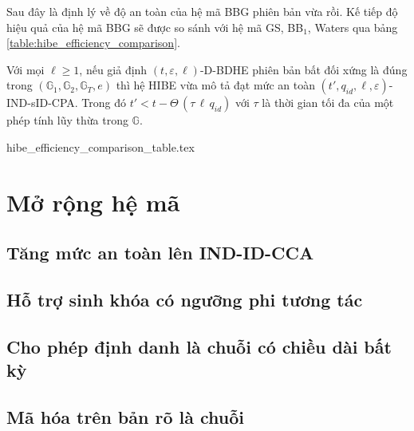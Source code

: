 \documentclass[class=report, crop=false]{standalone}
\begin{document}
		Sau đây là định lý về độ an toàn của hệ mã BBG phiên bản vừa rồi. Kế tiếp độ hiệu quả của hệ mã BBG sẽ được so sánh với hệ mã GS, BB$_1$, Waters qua bảng \ref{table:hibe_efficiency_comparison}.
		\begin{theorem}
			Với mọi $\ell \geq 1$, nếu giả định $(t, \varepsilon, \ell)$-D-BDHE phiên bản bất đối xứng là đúng trong $(\mathbb{G}_1, \mathbb{G}_2, \mathbb{G}_T, e)$ thì hệ HIBE vừa mô tả đạt mức an toàn $(t', q_{id}, \ell, \varepsilon)$-IND-sID-CPA. Trong đó $t' < t - \Theta\,(\tau\, \ell\, q_{id})$ với $\tau$ là thời gian tối đa của một phép tính lũy thừa trong $\mathbb{G}$.
		\end{theorem}
		{hibe_efficiency_comparison_table.tex}
	\section{Mở rộng hệ mã}
		\subsection{Tăng mức an toàn lên IND-ID-CCA}
			
		\subsection{Hỗ trợ sinh khóa có ngưỡng phi tương tác}
		\subsection{Cho phép định danh là chuỗi có chiều dài bất kỳ}
		\subsection{Mã hóa trên bản rõ là chuỗi}


	\newpage
\end{document}
